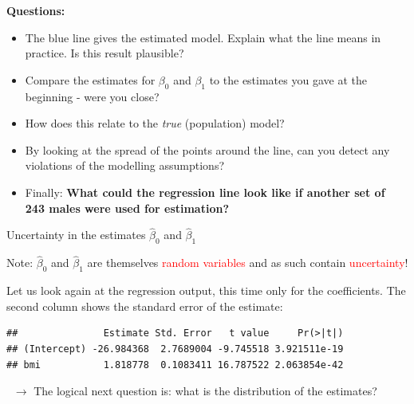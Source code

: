 \documentclass[10pt,ignorenonframetext,]{beamer}
\newenvironment{Shaded}{\begin{snugshade}}{\end{snugshade}}
\newcommand{\KeywordTok}[1]{\textcolor[rgb]{0.13,0.29,0.53}{\textbf{#1}}}
\newcommand{\OperatorTok}[1]{\textcolor[rgb]{0.81,0.36,0.00}{\textbf{#1}}}
\newcommand{\NormalTok}[1]{#1}
\begin{document}
\begin{frame}

\textbf{Questions:}

\begin{itemize}
\item
  The blue line gives the estimated model. Explain what the line means
  in practice. Is this result plausible?
\item
  Compare the estimates for \(\beta_0\) and \(\beta_1\) to the estimates
  you gave at the beginning - were you close?
\item
  How does this relate to the \emph{true} (population) model?
\item
  By looking at the spread of the points around the line, can you detect
  any violations of the modelling assumptions?
\item
  Finally: \textbf{What could the regression line look like if another
  set of 243 males were used for estimation?}
\end{itemize}

\end{frame}

\begin{frame}[fragile]

\begin{block}{Uncertainty in the estimates \(\hat\beta_0\) and
\(\hat\beta_1\)}

\vspace{2mm}

Note: \(\hat\beta_0\) and \(\hat\beta_1\) are themselves
\textcolor{red}{random variables} and as such contain
\textcolor{red}{uncertainty}!

\vspace{4mm}

Let us look again at the regression output, this time only for the
coefficients. The second column shows the standard error of the
estimate: \vspace{2mm}

\small

\begin{Shaded}
\end{Shaded}

\begin{verbatim}
##               Estimate Std. Error   t value     Pr(>|t|)
## (Intercept) -26.984368  2.7689004 -9.745518 3.921511e-19
## bmi           1.818778  0.1083411 16.787522 2.063854e-42
\end{verbatim}

\normalsize
\(~\) \(\rightarrow\) The logical next question is: what is the
distribution of the estimates?

\end{block}

\end{frame}
\end{document}
